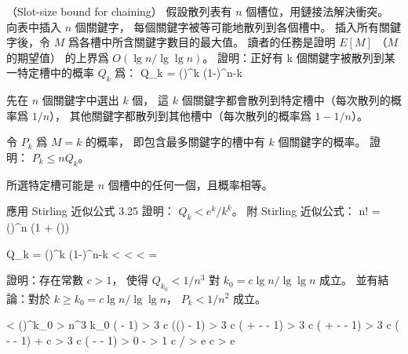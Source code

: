 \startPROBLEM
（Slot-size bound for chaining）
假設散列表有 $n$ 個槽位，用鏈接法解決衝突。
向表中插入 $n$ 個關鍵字，
每個關鍵字被等可能地散列到各個槽中。
插入所有關鍵字後，令 $M$ 爲各槽中所含關鍵字數目的最大值。
讀者的任務是證明 $E[M]$ （$M$ 的期望值）
的上界爲 $O(\lg{n}/\lg\lg{n})$。
\startigBase[a]\startitem
證明：正好有 k 個關鍵字被散列到某一特定槽中的概率 $Q_k$ 爲：
\startformula
Q_k = \left(\right)^k
      \left(1-\right)^{n-k}
\stopformula
\stopitem\stopigBase

\startANSWER
先在 $n$ 個關鍵字中選出 $k$ 個，
這 $k$ 個關鍵字都會散列到特定槽中（每次散列的概率爲 $1/n$），
其他關鍵字都散列到其他槽中（每次散列的概率爲 $1- 1/n$）。
\stopANSWER

\startigBase[continue]\startitem
令 $P_k$ 爲 $M=k$ 的概率，
即包含最多關鍵字的槽中有 $k$ 個關鍵字的概率。
證明： $P_k\le n Q_k$。
\stopitem\stopigBase

\startANSWER
所選特定槽可能是 $n$ 個槽中的任何一個，且概率相等。
\stopANSWER

\startigBase[continue]\startitem
應用 Stirling 近似公式 3.25 證明： $Q_k < e^k / k^k$。
附 Stirling 近似公式：
\startformula
n! = 
     \left(\right)^n
     \left(1 + \Theta\left(\right)\right)
\stopformula
\stopitem\stopigBase

\startANSWER
\startsplitformula\startmathalignment
\NC Q_k
    \NC = \left(\right)^k
          \left(1-\right)^{n-k}  \NR
\NC \NC <   \NR
\NC \NC <  \NR
\NC \NC <  \NR
\NC \NC =  \NR
\stopmathalignment\stopsplitformula
\stopANSWER

\startigBase[continue]\startitem
證明：存在常數 $c>1$，
使得 $Q_{k_0} < 1/n^3$ 對 $k_0 = c \lg{n}/\lg\lg{n}$ 成立。
並有結論：對於 $k\ge k_0 = c\lg{n}/\lg\lg{n}$， $P_k < 1/n^2$ 成立。
\stopitem\stopigBase

\startANSWER
\startsplitformula\startmathalignment
\NC {} \NC<  \NR
\NC ()^{k_0} \NC> n^3 \NR
{}
\NC k_0 ( - 1) \NC> 3  \NR
\NC c  (\lg() - 1)
   \NC> 3  \NR
\NC c  ( + \lg{} - \lg\lg{} - 1)
   \NC> 3  \NR
\NC c ( + \lg{} - \lg\lg{} - 1)
   \NC> 3 \lg{} \NR
\NC c ( - \lg\lg{} - 1) + c \lg{}
   \NC> 3 \lg{} \NR
{}
\NC c ( - \lg\lg{} - 1) \NC> 0 \NR
\NC {} - \lg\lg{} \NC> 1 \NR
\NC c / \lg{} \NC> e \NR
\NC c \NC> e \lg{} \NR
\stopmathalignment\stopsplitformula

